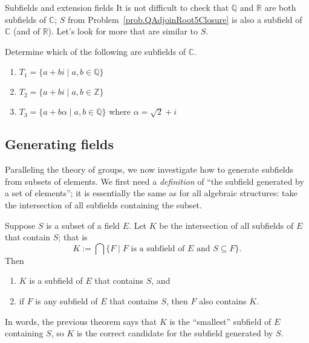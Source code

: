 \begin{section}{Subfields and extension fields}
It is not difficult to check that $\mathbb{Q}$ and $\mathbb{R}$ are both subfields of $\mathbb{C}$; $S$ from Problem~\ref{prob.QAdjoinRoot5Closure} is also a subfield of $\mathbb{C}$ (and of $\mathbb{R}$). Let's look for more that are similar to $S$.

\begin{problem}\label{prob.SubfieldRoot2PlusI}
Determine which of the following are subfields of $\mathbb{C}$.
\begin{enumerate}
\item\label{prob.SubfieldRoot2PlusI.QAdjoinI} $T_1=\{a+bi\mid a,b\in \mathbb{Q}\}$
\item $T_2=\{a+bi\mid a,b\in \mathbb{Z}\}$
\item\label{prob.SubfieldRoot2PlusI.QAdjoinRoot2PlusI} $T_3=\{a+b\alpha\mid a,b\in \mathbb{Q}\}$ where  $\alpha = \sqrt{2} + i$
\end{enumerate}
\end{problem}


\subsection{Generating fields}
Paralleling the theory of groups, we now investigate how to generate subfields from subsets of elements. We first need a \emph{definition} of ``the subfield generated by a set of elements'';  it is essentially the same as for all algebraic structures: take the intersection of all subfields containing the subset.

\begin{theorem}\label{thm.IntersectFields}
Suppose $S$ is a subset of a field $E$. Let $K$ be the intersection of all subfields of $E$ that contain $S$; that is \[K:=\bigcap\{F\mid \text{$F$ is a subfield of $E$ and  $S\subseteq F$}\}.\]
Then 
\begin{enumerate}
\item $K$ is a subfield of $E$ that contains $S$, and
\item if $F$ is any subfield of $E$ that contains $S$, then $F$ also contains $K$.
\end{enumerate}
\end{theorem}

In words, the previous theorem says that $K$ is the ``smallest'' subfield of $E$ containing $S$, so  $K$ is the correct candidate for the subfield generated by $S$.


\end{section}
